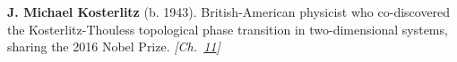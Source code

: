 \nobelphysics \textbf{J. Michael Kosterlitz} (b. 1943). British-American physicist who co-discovered the Kosterlitz-Thouless topological phase transition in two-dimensional systems, sharing the 2016 Nobel Prize. \emph{[Ch.~\hyperref[ch:topologicalinsulators]{11}]}

